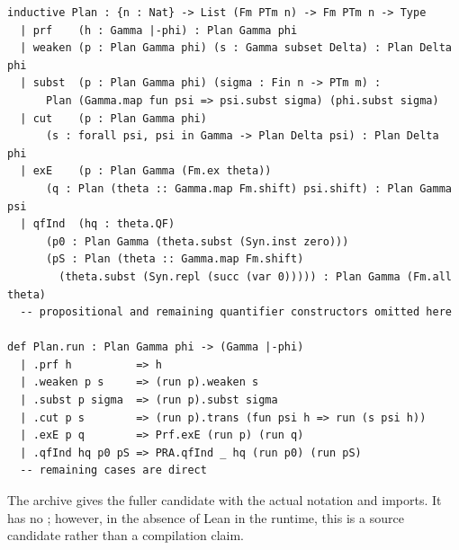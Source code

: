 \begin{lstlisting}[language=Lean]
inductive Plan : {n : Nat} -> List (Fm PTm n) -> Fm PTm n -> Type
  | prf    (h : Gamma |-phi) : Plan Gamma phi
  | weaken (p : Plan Gamma phi) (s : Gamma subset Delta) : Plan Delta phi
  | subst  (p : Plan Gamma phi) (sigma : Fin n -> PTm m) :
      Plan (Gamma.map fun psi => psi.subst sigma) (phi.subst sigma)
  | cut    (p : Plan Gamma phi)
      (s : forall psi, psi in Gamma -> Plan Delta psi) : Plan Delta phi
  | exE    (p : Plan Gamma (Fm.ex theta))
      (q : Plan (theta :: Gamma.map Fm.shift) psi.shift) : Plan Gamma psi
  | qfInd  (hq : theta.QF)
      (p0 : Plan Gamma (theta.subst (Syn.inst zero)))
      (pS : Plan (theta :: Gamma.map Fm.shift)
        (theta.subst (Syn.repl (succ (var 0))))) : Plan Gamma (Fm.all theta)
  -- propositional and remaining quantifier constructors omitted here

def Plan.run : Plan Gamma phi -> (Gamma |-phi)
  | .prf h          => h
  | .weaken p s     => (run p).weaken s
  | .subst p sigma  => (run p).subst sigma
  | .cut p s        => (run p).trans (fun psi h => run (s psi h))
  | .exE p q        => Prf.exE (run p) (run q)
  | .qfInd hq p0 pS => PRA.qfInd _ hq (run p0) (run pS)
  -- remaining cases are direct
\end{lstlisting}

The archive gives the fuller candidate with the actual notation and imports.  It has no
; however, in the absence of Lean in the runtime, this is a source candidate rather than
a compilation claim.
